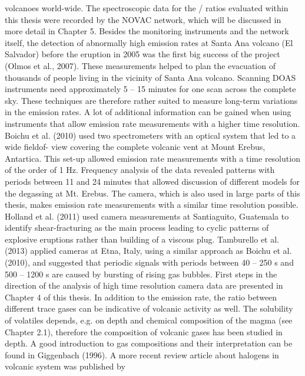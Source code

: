 \documentclass  [
  paper    = a4,
  BCOR     = 10mm,
  twoside,
  fontsize = 12pt,
  fleqn,
  toc      = bibnumbered,
  toc      = listofnumbered,
  numbers  = noendperiod,
  headings = normal,
  listof   = leveldown,
  version  = 3.03
]                                       {scrreprt}
\begin{document}
	volcanoes world-wide. The spectroscopic data for the / ratios evaluated
	within this thesis were recorded by the NOVAC network, which will be discussed
	in more detail in Chapter 5. Besides the monitoring instruments and the network
	itself, the detection of abnormally high  emission rates at Santa Ana volcano
	(El Salvador) before the eruption in 2005 was the first big success of the project
	(Olmos et al., 2007). These measurements helped to plan the evacuation of
	thousands of people living in the vicinity of Santa Ana volcano. Scanning DOAS
	instruments need approximately 5 – 15 minutes for one scan across the complete
	sky. These techniques are therefore rather suited to measure long-term variations
	in the  emission rates.
	A lot of additional information can be gained when using instruments that
	allow emission rate measurements with a higher time resolution. Boichu et al.
	(2010) used two spectrometers with an optical system that led to a wide fieldof-
	view covering the complete volcanic vent at Mount Erebus, Antartica. This
	set-up allowed  emission rate measurements with a time resolution of the
	order of 1 Hz. Frequency analysis of the data revealed patterns with periods
	between 11 and 24 minutes that allowed discussion of different models for the
	degassing at Mt. Erebus. The  camera, which is also used in large parts of
	this thesis, makes  emission rate measurements with a similar time resolution
	possible. Holland et al. (2011) used  camera measurements at Santiaguito,
	Guatemala to identify shear-fracturing as the main process leading to cyclic
	patterns of explosive eruptions rather than building of a viscous plug. Tamburello
	et al. (2013) applied  cameras at Etna, Italy, using a similar approach as
	Boichu et al. (2010), and suggested that periodic signals with periods between
	40 – 250 s and 500 – 1200 s are caused by bursting of rising gas bubbles. First
	steps in the direction of the analysis of high time resolution  camera data
	are presented in Chapter 4 of this thesis.
	In addition to the  emission rate, the ratio between different trace gases can
	be indicative of volcanic activity as well. The solubility of volatiles depends, e.g.
	on depth and chemical composition of the magma (see Chapter 2.1), therefore
	the composition of volcanic gases has been studied in depth. A good introduction
	to gas compositions and their interpretation can be found in Giggenbach (1996).
	A more recent review article about halogens in volcanic system was published by
\end{document}
